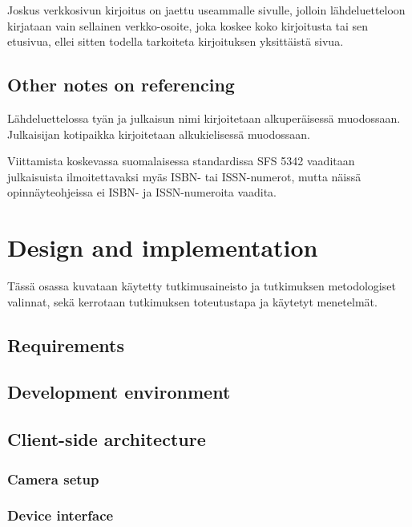 \documentclass[english,12pt,a4paper,pdftex]{article}
\begin{document}
Joskus verkkosivun kirjoitus on jaettu useammalle sivulle, jolloin
lähdeluetteloon kirjataan vain sellainen verkko-osoite, joka koskee
koko kirjoitusta tai sen etusivua, ellei sitten
todella tarkoiteta kirjoituksen yksittäistä sivua.

\subsection*{Other notes on referencing}

Lähdeluettelossa tyän ja julkaisun nimi kirjoitetaan alkuperäisessä
muodossaan. Julkaisijan kotipaikka kirjoitetaan alkukielisessä
muodossaan.

Viittamista koskevassa suomalaisessa standardissa
SFS 5342 \cite{sfs} vaaditaan julkaisuista ilmoitettavaksi myäs ISBN- tai
ISSN-numerot, mutta näissä opinnäyteohjeissa ei ISBN- ja
ISSN-numeroita vaadita.

\clearpage

\section{Design and implementation}

Tässä osassa kuvataan käytetty tutkimusaineisto ja
tutkimuksen metodologiset valinnat, sekä
kerrotaan tutkimuksen toteutustapa ja käytetyt menetelmät.

\subsection{Requirements}

\subsection{Development environment}

\subsection{Client-side architecture}

\subsubsection{Camera setup}

\subsubsection{Device interface}
\end{document}
